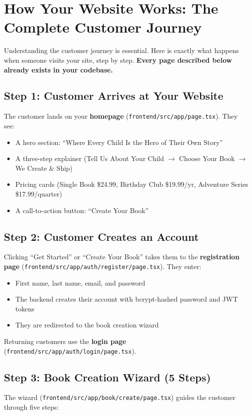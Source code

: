 \documentclass[12pt, letterpaper, oneside]{book}
\begin{document}
\section{How Your Website Works: The Complete Customer Journey}

Understanding the customer journey is essential. Here is exactly what happens when someone visits your site, step by step. \textbf{Every page described below already exists in your codebase.}

\subsection*{Step 1: Customer Arrives at Your Website}
The customer lands on your \textbf{homepage} (\texttt{frontend/src/app/page.tsx}). They see:
\begin{itemize}[leftmargin=2em]
  \item A hero section: ``Where Every Child Is the Hero of Their Own Story''
  \item A three-step explainer (Tell Us About Your Child $\rightarrow$ Choose Your Book $\rightarrow$ We Create \& Ship)
  \item Pricing cards (Single Book \$24.99, Birthday Club \$19.99/yr, Adventure Series \$17.99/quarter)
  \item A call-to-action button: ``Create Your Book''
\end{itemize}

\subsection*{Step 2: Customer Creates an Account}
Clicking ``Get Started'' or ``Create Your Book'' takes them to the \textbf{registration page} (\texttt{frontend/src/app/auth/register/page.tsx}). They enter:
\begin{itemize}[leftmargin=2em]
  \item First name, last name, email, and password
  \item The backend creates their account with bcrypt-hashed password and JWT tokens
  \item They are redirected to the book creation wizard
\end{itemize}
Returning customers use the \textbf{login page} (\texttt{frontend/src/app/auth/login/page.tsx}).

\subsection*{Step 3: Book Creation Wizard (5 Steps)}
The wizard (\texttt{frontend/src/app/book/create/page.tsx}) guides the customer through five steps:
\end{document}
